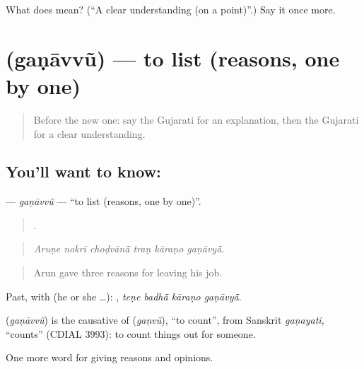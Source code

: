 \begin{tcolorbox}[breakable,colback=teal!4,colframe=teal!35!black,title={Before you move on}]
What does  mean? (\textquotedblleft{}A clear understanding (on a point)\textquotedblright{}.) Say it once more.
\end{tcolorbox}
\section[\texorpdfstring{\gu{ગણાવવું} (gaṇāvvũ)}{ગણાવવું (gaṇāvvũ)}]{ (gaṇāvvũ) — to list (reasons, one by one)}

\label{lesson:GU-C345-ganavvu}



\begin{quote}
Before the new one: say the Gujarati for an explanation, then the Gujarati for a clear understanding.
\end{quote}

\subsection*{You'll want to know: }
\textbf{} — \emph{gaṇāvvũ} — \textquotedblleft{}to list (reasons, one by one)\textquotedblright{}.

\begin{quote}
     .
\end{quote}

\begin{quote}
\emph{Aruṇe nokrī choḍvānā̃ traṇ kāraṇo gaṇāvyā̃.}
\end{quote}

\begin{quote}
Arun gave three reasons for leaving his job.
\end{quote}

Past, with  (he or she …):    , \emph{teṇe badhā̃ kāraṇo gaṇāvyā̃}.

\begin{cousinweb}
\textbf{} (\emph{gaṇāvvũ}) is the causative of \textbf{} (\emph{gaṇvũ}), \textquotedblleft{}to count\textquotedblright{}, from Sanskrit \emph{gaṇayati}, \textquotedblleft{}counts\textquotedblright{} (CDIAL 3993): to count things out for someone.
\end{cousinweb}

\begin{grammarlens}[title={What you've built}]
One more word for giving reasons and opinions.
\end{grammarlens}

